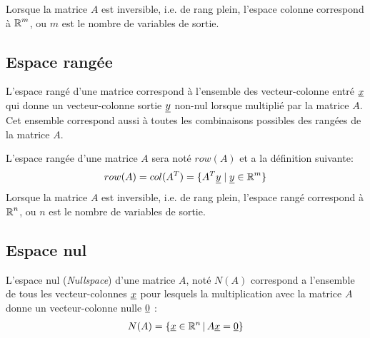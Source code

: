 
Lorsque la matrice $A$ est inversible, i.e. de rang plein, l'espace colonne correspond à $\operatorname{\mathbb{R}}^m$, ou $m$ est le nombre de variables de sortie.

\subsection{Espace rangée}
\label{sec:esprow}

L'espace rangé d'une matrice correspond à l'ensemble des vecteur-colonne entré $\underline{x}$ qui donne un vecteur-colonne sortie $\underline{y}$ non-nul lorsque multiplié par la matrice $A$. Cet ensemble correspond aussi à toutes les combinaisons possibles des rangées de la matrice $A$.


L'espace rangée d'une matrice $A$ sera noté $row(A)$ et a la définition suivante:
\begin{align}
row(A) =  col(A^T) = 
\{ A^T \underline{y} \; | \; \underline{y} \in \operatorname{\mathbb{R}}^m \}
\end{align}
Lorsque la matrice $A$ est inversible, i.e. de rang plein, l'espace rangé correspond à $\operatorname{\mathbb{R}}^n$, ou $n$ est le nombre de variables de sortie.

\subsection{Espace nul}
\label{sec:nullspace}

L'espace nul (\textit{Nullspace}) d'une matrice $A$, noté $N(A)$ correspond a l'ensemble de tous les vecteur-colonnes $\underline{x}$ pour lesquels la multiplication avec la matrice $A$ donne un vecteur-colonne nulle $\underline{0}$ :
\begin{align}
N(A) = \left\{ \underline{x} \in \mathbb{R}^n \,|\, A\underline{x} = \underline{0} \right\}
\end{align}

